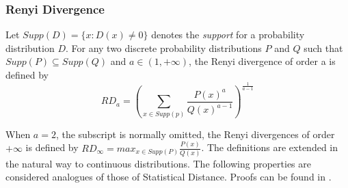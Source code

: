 \subsubsection{Renyi Divergence}
\label{sec:renyisubdefinition}
\begin{definition}
   Let \(Supp(D) = \{x: D(x) \neq 0\}\) denotes the
  \textit{support} for a probability distribution \(D\). For any two discrete
  probability distributions \(P\) and \(Q\) such that
  \(Supp(P) \subseteq Supp(Q)\) and \(a \in (1, +\infty)\), the Renyi divergence
  of order a is defined by\\
  $$RD_{a} = \left(\sum_{x \in Supp(p)}\frac{P(x)^{a}}{Q(x)^{a-1}}\right)^{\frac{1}{a-1}}$$
\end{definition}
When \(a = 2\), the subscript is normally omitted, the Renyi divergences of
order \(+\infty\) is defined by
\(RD_{\infty} = max_{x \in Supp(P)}\frac{P(x)}{Q(x)}\). The definitions are
extended in the natural way to continuous distributions. The following
properties are considered analogues of those of Statistical Distance. Proofs can
be found in \cite{langlois2014gghlite}.
